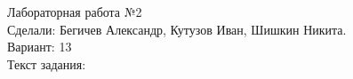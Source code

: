 \documentclass[12pt,a4paper,oneside,draft,notitlepage]{article}
\begin{document}
\noindent
Лабораторная работа №2 \\
Сделали: Бегичев Александр, Кутузов Иван, Шишкин Никита. \\
Вариант: 13 \\
Текст задания: \\

 
\end{document}

